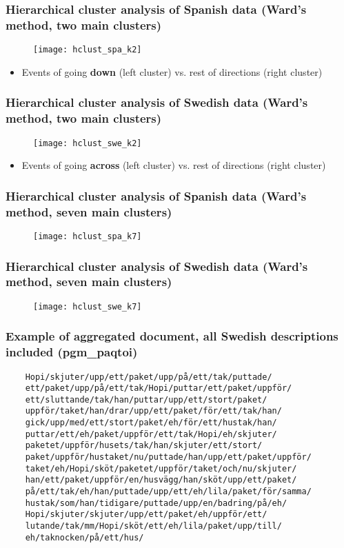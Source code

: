 \documentclass[]{beamer}
\newcommand{\backupend}{
   \addtocounter{framenumberappendix}{-\value{framenumber}}
   \addtocounter{framenumber}{\value{framenumberappendix}} 
}
\begin{document}
\begin{frame}
	\frametitle{Hierarchical cluster analysis of Spanish data (Ward's method, two main clusters)}
	\begin{figure}
	\texttt{[image: hclust\_spa\_k2]}
	\end{figure}
	\begin{itemize}
	\item Events of going \textbf{down} (left cluster) vs. rest of directions (right cluster)
	\end{itemize}
\end{frame}

\begin{frame}
		\frametitle{Hierarchical cluster analysis of Swedish data (Ward's method, two main clusters)}
		\begin{figure}
	\texttt{[image: hclust\_swe\_k2]}
	\end{figure}
	\begin{itemize}
	\item Events of going \textbf{across} (left cluster) vs. rest of directions (right cluster)
	\end{itemize}
\end{frame}

\begin{frame}
	\frametitle{Hierarchical cluster analysis of Spanish data (Ward's method, seven main clusters)}
	\begin{figure}
	\texttt{[image: hclust\_spa\_k7]}
	\end{figure}
\end{frame}

\begin{frame}
		\frametitle{Hierarchical cluster analysis of Swedish data (Ward's method, seven main clusters)}
		\begin{figure}
	\texttt{[image: hclust\_swe\_k7]}
	\end{figure}
\end{frame}


\begin{frame}[fragile]
	\frametitle{Example of aggregated document, all Swedish descriptions included (pgm\_paqtoi)}
	\begin{verbatim}
	Hopi/skjuter/upp/ett/paket/upp/på/ett/tak/puttade/
	ett/paket/upp/på/ett/tak/Hopi/puttar/ett/paket/uppför/
	ett/sluttande/tak/han/puttar/upp/ett/stort/paket/
	uppför/taket/han/drar/upp/ett/paket/för/ett/tak/han/
	gick/upp/med/ett/stort/paket/eh/för/ett/hustak/han/
	puttar/ett/eh/paket/uppför/ett/tak/Hopi/eh/skjuter/
	paketet/uppför/husets/tak/han/skjuter/ett/stort/
	paket/uppför/hustaket/nu/puttade/han/upp/ett/paket/uppför/
	taket/eh/Hopi/sköt/paketet/uppför/taket/och/nu/skjuter/
	han/ett/paket/uppför/en/husvägg/han/sköt/upp/ett/paket/
	på/ett/tak/eh/han/puttade/upp/ett/eh/lila/paket/för/samma/
	hustak/som/han/tidigare/puttade/upp/en/badring/på/eh/
	Hopi/skjuter/skjuter/upp/ett/paket/eh/uppför/ett/
	lutande/tak/mm/Hopi/sköt/ett/eh/lila/paket/upp/till/
	eh/taknocken/på/ett/hus/
	\end{verbatim}
\end{frame}


\backupend
\end{document}
